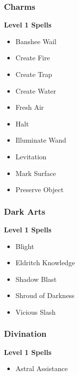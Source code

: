 \begin{multicols}{4} \raggedbottom\subsubsection{Charms}
\textbf{Level 1 Spells}
\begin{itemize}[itemsep=0em]
\renewcommand\labelitemi{-}
\item Banshee Wail

\item Create Fire

\item Create Trap

\item Create Water

\item Fresh Air

\item Halt

\item Illuminate Wand

\item Levitation

\item Mark Surface

\item Preserve Object


\end{itemize}
\subsubsection{Dark Arts}
\textbf{Level 1 Spells}
\begin{itemize}[itemsep=0em]
\renewcommand\labelitemi{-}
\item Blight

\item Eldritch Knowledge

\item Shadow Blast

\item Shroud of Darkness

\item Vicious Slash


\end{itemize}
\vfill\null
\columnbreak\subsubsection{Divination}
\textbf{Level 1 Spells}
\begin{itemize}[itemsep=0em]
\renewcommand\labelitemi{-}
\item Astral Assistance


\end{itemize}
\end{multicols}
